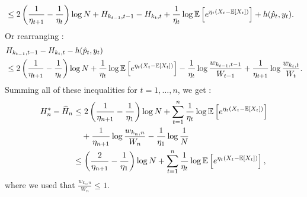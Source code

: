 \begin{solution}[]
\begin{align*}
	&\leq 2 \left( \frac{1}{\eta_{t+1}}- \frac{1}{\eta_t} \right) \log N + H_{k_{t-1},t-1} - H_{k_t,t} + \frac{1}{\eta_t}\log \mathbb{E}\left[e^{\eta_t(X_t-\mathbb{E}\left[X_t\right])}\right] + h(\hat{p}_t,y_t).
\end{align*}
Or rearranging :
\begin{align*}
	& H_{k_{t-1},t-1} - H_{k_t,t} - h(\hat{p}_t,y_t)\\
	&\leq 2 \left( \frac{1}{\eta_{t+1}}- \frac{1}{\eta_t} \right) \log N + \frac{1}{\eta_t}\log \mathbb{E}\left[e^{\eta_t(X_t-\mathbb{E}\left[X_t\right])}\right] -\frac{1}{\eta_t} \log \frac{w_{k_{t-1},t-1}}{W_{t-1}} +\frac{1}{\eta_{t+1}}\log \frac{w_{k_t,t}}{W_t}.
\end{align*}
Summing all of these inequalities for $ t=1,\ldots,n $, we get :
\begin{align*}
	H_n^{*} - \widehat{H}_n &\leq 2\left( \frac{1}{\eta_{n+1}} - \frac{1}{\eta_1} \right) \log N + \sum_{t=1}^{n}\frac{1}{\eta_t}\log \mathbb{E}\left[e^{\eta_t(X_t-\mathbb{E}\left[X_t\right])}\right]\\
				&\quad+ \frac{1}{\eta_{n+1}} \log \frac{w_{k_n,n}}{W_n} - \frac{1}{\eta_1}\log \frac{1}{N} \\
				&\leq \left( \frac{2}{\eta_{n+1}} - \frac{1}{\eta_1} \right) \log N + \sum_{t=1}^{n}\frac{1}{\eta_t}\log \mathbb{E}\left[e^{\eta_t(X_t-\mathbb{E}\left[X_t\right])}\right],
\end{align*}
where we used that $ \frac{w_{k_n,n}}{W_n} \leq 1 $.





\end{solution}
